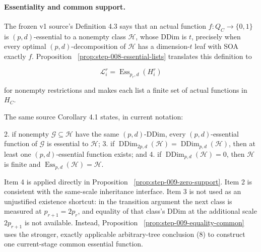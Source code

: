 \paragraph{Essentiality and common support.}

The frozen v1 source's Definition 4.3 says that an actual function
\(f:Q_C\to\{0,1\}\) is \((p,d)\)-essential to a nonempty class
\(\mathcal H\), whose DDim is \(t\), precisely when every optimal
\((p,d)\)-decomposition of \(\mathcal H\) has a dimension-\(t\) leaf with
SOA exactly \(f\). Proposition
~\ref{prop:step-008-essential-lists} translates this definition to

\[
 \mathcal L_i^r=\operatorname{Ess}_{p_r,d}(H_i^r)
 \tag{10}
\]

for nonempty restrictions and makes each list a finite set of actual
functions in \(H_C\).

The same source Corollary 4.1 states, in current notation:

2. if nonempty \(\mathcal G\subseteq\mathcal H\) have the same
   \((p,d)\)-DDim, every \((p,d)\)-essential function of \(\mathcal G\) is
   essential to \(\mathcal H\);
3. if
   \(\operatorname{DDim}_{2p,d}(\mathcal H)
      =\operatorname{DDim}_{p,d}(\mathcal H)\), then at least one
   \((p,d)\)-essential function exists; and
4. if \(\operatorname{DDim}_{p,d}(\mathcal H)=0\), then \(\mathcal H\) is
   finite and
   \(\operatorname{Ess}_{p,d}(\mathcal H)=\mathcal H\).

Item 4 is applied directly in Proposition
~\ref{prop:step-009-zero-support}. Item 2 is consistent with the 
same-scale inheritance interface. Item 3 is not used as an unjustified
existence shortcut: in the transition argument the next class is measured
at \(p_{r+1}=2p_r\), and equality of that class's DDim at the additional
scale \(2p_{r+1}\) is not available. Instead, Proposition
~\ref{prop:step-009-equality-common} uses the stronger, exactly applicable
arbitrary-tree conclusion (8) to construct one current-stage common
essential function.

